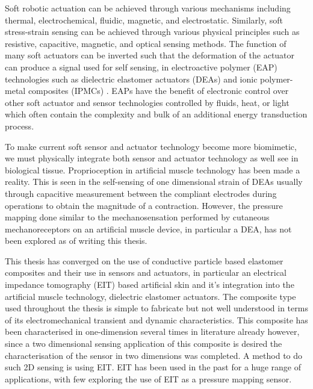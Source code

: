 Soft robotic actuation can be achieved through various mechanisms including thermal, electrochemical, fluidic, magnetic, and electrostatic. Similarly, soft stress-strain sensing can be achieved through various physical principles such as resistive, capacitive, magnetic, and optical sensing methods. The function of many soft actuators can be inverted such that the deformation of the actuator can produce a signal used for self sensing, in electroactive polymer (EAP) technologies such as dielectric elastomer actuators (DEAs) \cite{Gisby2013, Rosset2013, Liu2016, Huang2023} and ionic polymer-metal composites (IPMCs) \cite{MohdIsa2019}. EAPs have the benefit of electronic control over other soft actuator and sensor technologies controlled by fluids, heat, or light which often contain the complexity and bulk of an additional energy transduction process.

To make current soft sensor and actuator technology become more biomimetic, we must physically integrate both sensor and actuator technology as well see in biological tissue. Proprioception in artificial muscle technology has been made a reality. This is seen in the self-sensing of one dimensional strain of DEAs usually through capacitive measurement between the compliant electrodes during operations to obtain the magnitude of a contraction. However, the pressure mapping done similar to the mechanosensation performed by cutaneous mechanoreceptors on an artificial muscle device, in particular a DEA, has not been explored as of writing this thesis. 

This thesis has converged on the use of conductive particle based elastomer composites and their use in sensors and actuators, in particular an electrical impedance tomography (EIT) based artificial skin and it's integration into the artificial muscle technology, dielectric elastomer actuators. The composite type used throughout the thesis is simple to fabricate but not well understood in terms of its electromechanical transient and dynamic characteristics. This composite has been characterised in one-dimension several times in literature already however, since a two dimensional sensing application of this composite is desired the characterisation of the sensor in two dimensions was completed. A method to do such 2D sensing is using EIT. EIT has been used in the past for a huge range of applications, with few exploring the use of EIT as a pressure mapping sensor. 


